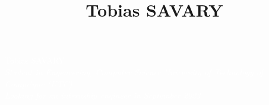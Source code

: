 \documentclass[9pt, oneside, a4paper, titlepage]{extarticle}
\title{Tobias SAVARY}
\date{}
\begin{document}
    \begin{tcolorbox}
        \begin{minipage}{0.3\linewidth}
            \hspace*{1cm} %
        \end{minipage}%
        \hspace{1cm}%
        \begin{minipage}{0.5\linewidth}
            \begin{center}
                \Huge{\textcolor{white}{Tobias SAVARY}} \\
                \vspace*{0.5cm}
                \Large{\textcolor{white}{\emph{Student in Engeneering, Computer Science  University of Technology of Compiègne (UTC) \\
                Looking for an internship engineer in September 2023
                }}}
            \end{center}
        \end{minipage}%
    \end{tcolorbox}
\end{document}
